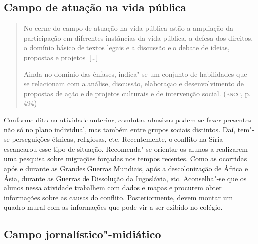 \documentclass[12pt]{extarticle}
\begin{document}
\subsection{Campo de atuação na vida pública}

\begin{quote}
No cerne do campo de atuação na vida pública estão a ampliação da
participação em diferentes instâncias da vida pública, a defesa dos
direitos, o domínio básico de textos legais e a discussão e o debate de
ideias, propostas e projetos. {[}\ldots{}{]}

Ainda no domínio das ênfases, indica"-se um conjunto de habilidades que
se relacionam com a análise, discussão, elaboração e desenvolvimento de
propostas de ação e de projetos culturais e de intervenção social.
(\textsc{bncc}, p. 494)
\end{quote}

Conforme dito na atividade anterior, condutas abusivas podem se fazer
presentes não só no plano individual, mas também entre grupos sociais
distintos. Daí, tem"-se perseguições étnicas, religiosas, etc.
Recentemente, o conflito na Síria escancarou esse tipo de situação.
Recomenda"-se orientar os alunos a realizarem uma pesquisa sobre
migrações forçadas nos tempos recentes. Como as ocorridas após e
durante as Grandes Guerras Mundiais, após a descolonização de África e
Ásia, durante as Guerras de Dissolução da Iugoslávia, etc.
Aconselha"-se que os alunos nessa atividade trabalhem com dados e mapas
e procurem obter informações sobre as causas do conflito.
Posteriormente, devem montar um quadro mural com as informações que
pode vir a ser exibido no colégio.

\subsection{Campo jornalístico"-midiático}
\end{document}
